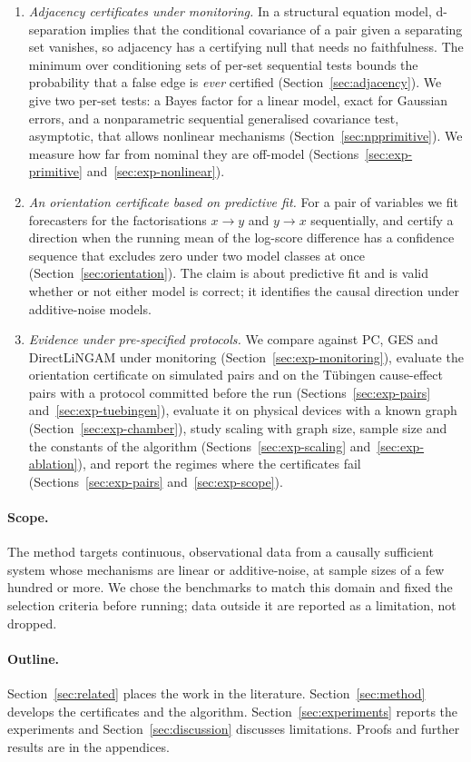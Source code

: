 \begin{enumerate}
\item \emph{Adjacency certificates under monitoring.} In a structural equation
  model, d-separation implies that the conditional covariance of a pair given
  a separating set vanishes, so adjacency has a certifying null that needs no
  faithfulness. The minimum over conditioning sets of per-set sequential tests
  bounds the probability that a false edge is \emph{ever} certified
  (Section~\ref{sec:adjacency}). We give two per-set tests: a Bayes factor for a
  linear model, exact for Gaussian errors, and a nonparametric sequential
  generalised covariance test, asymptotic, that allows nonlinear mechanisms
  (Section~\ref{sec:npprimitive}). We measure how far from nominal they are
  off-model (Sections~\ref{sec:exp-primitive} and~\ref{sec:exp-nonlinear}).
\item \emph{An orientation certificate based on predictive fit.} For a pair of
  variables we fit forecasters for the factorisations $x\to y$ and $y\to x$
  sequentially, and certify a direction when the running mean of the
  log-score difference has a confidence sequence that excludes zero under two
  model classes at once (Section~\ref{sec:orientation}). The claim is about
  predictive fit and is valid whether or not either model is correct; it
  identifies the causal direction under additive-noise models.
\item \emph{Evidence under pre-specified protocols.} We compare against PC,
  GES and DirectLiNGAM under monitoring (Section~\ref{sec:exp-monitoring}),
  evaluate the orientation certificate on simulated pairs and on the
  Tübingen cause-effect pairs with a protocol committed before the run
  (Sections~\ref{sec:exp-pairs} and~\ref{sec:exp-tuebingen}), evaluate it on physical devices with a known graph
  (Section~\ref{sec:exp-chamber}), study scaling with graph size, sample size and the constants of the algorithm
  (Sections~\ref{sec:exp-scaling} and~\ref{sec:exp-ablation}), and report the
  regimes where the certificates fail (Sections~\ref{sec:exp-pairs}
  and~\ref{sec:exp-scope}).
\end{enumerate}

\paragraph{Scope.} The method targets continuous, observational data from a
causally sufficient system whose mechanisms are linear or additive-noise, at
sample sizes of a few hundred or more. We chose the benchmarks to match this
domain and fixed the selection criteria before running; data outside it are
reported as a limitation, not dropped.

\paragraph{Outline.} Section~\ref{sec:related} places the work in the literature.
Section~\ref{sec:method} develops the certificates and the algorithm.
Section~\ref{sec:experiments} reports the experiments and
Section~\ref{sec:discussion} discusses limitations. Proofs and further results
are in the appendices.
